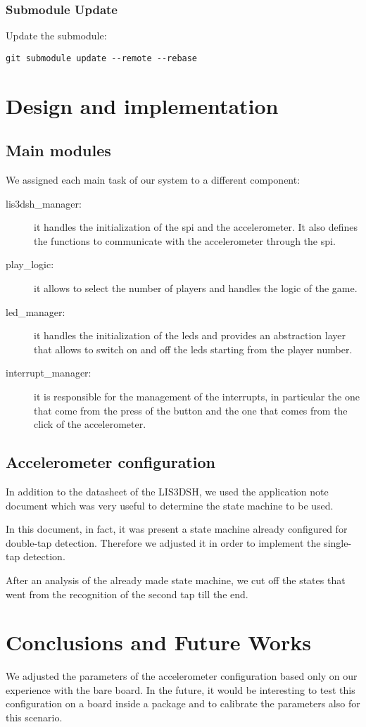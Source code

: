 \hypertarget{submodule-update}{%
\subsubsection{Submodule Update}\label{submodule-update}}

Update the submodule:

\begin{verbatim}
git submodule update --remote --rebase
\end{verbatim}

\section{Design and implementation}
\subsection{Main modules}
We assigned each main task of our system to a different component:

\begin{description}
  \item [lis3dsh\_manager:] it handles the initialization of the spi and the
    accelerometer. It also defines the functions to communicate with the accelerometer through
    the spi.
  \item [play\_logic:] it allows to select the number of players and handles the logic of the game.
  \item [led\_manager:] it handles the initialization of the leds and provides an
    abstraction layer that allows to switch on and off the leds starting from
    the player number.
  \item [interrupt\_manager:] it is responsible for the management of the
    interrupts, in particular the one that come from the press of the button and
    the one that comes from the click of the accelerometer.
\end{description}

\subsection{Accelerometer configuration}
In addition to the datasheet of the LIS3DSH, we used the application note
document \cite{note} which was very useful to determine the state machine to be used.

In this document, in fact, it was present a state machine already configured for
double-tap detection.
Therefore we adjusted it in order to implement the single-tap detection.

After an analysis of the already made state machine, we cut off the states that
went from the recognition of the second tap till the end.

\section{Conclusions and Future Works}
We adjusted the parameters of the accelerometer configuration based only
on our experience with the bare board.
In the future, it would be interesting to test this configuration on a board
inside a package and to calibrate the parameters also for this scenario.
